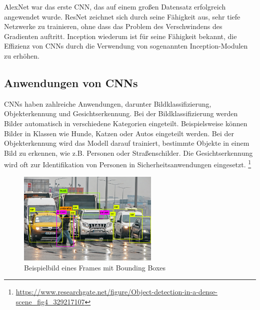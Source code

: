         AlexNet war das erste CNN, das auf einem großen Datensatz erfolgreich angewendet wurde.
        ResNet zeichnet sich durch seine Fähigkeit aus, sehr tiefe Netzwerke zu trainieren, ohne dass das Problem des Verschwindens des Gradienten auftritt.  
        Inception wiederum ist für seine Fähigkeit bekannt, die Effizienz von CNNs durch die Verwendung von sogenannten Inception-Modulen zu erhöhen.

    
    \subsection{Anwendungen von CNNs}
    
        CNNs haben zahlreiche Anwendungen, darunter Bildklassifizierung, Objekterkennung und Gesichtserkennung.      
        Bei der Bildklassifizierung werden Bilder automatisch in verschiedene Kategorien eingeteilt.      
        Beispielsweise können Bilder in Klassen wie Hunde, Katzen oder Autos eingeteilt werden.  
        Bei der Objekterkennung wird das Modell darauf trainiert, bestimmte Objekte in einem Bild zu erkennen, wie z.B.      Personen oder Straßenschilder.      
        Die Gesichtserkennung wird oft zur Identifikation von Personen in Sicherheitsanwendungen eingesetzt.
        \footnote{\url{https://www.researchgate.net/figure/Object-detection-in-a-dense-scene_fig4_329217107}}

        \begin{figure}[h]
            \centering
            \includegraphics[width=0.6\textwidth]{img/Object-detection-in-a-dense-scene.ppm.png}
            \caption{Beispielbild eines Frames mit Bounding Boxes}
            \label{fig:Beispielbild_eines_Frames_mit_Bounding_Boxes}
        \end{figure}


